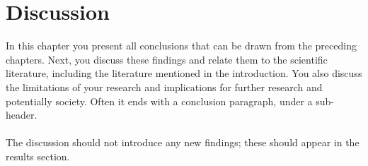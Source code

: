 \chapter{Discussion}\label{discussion}
In this chapter you present all conclusions that can be drawn from the preceding chapters. Next, you discuss these findings and relate them to the scientific literature, including the literature mentioned in the introduction. You also discuss the limitations of your research and implications for further research and potentially society. Often it ends with a conclusion paragraph, under a sub-header.
\\\\
The discussion should not introduce any new findings; these should appear in the results section.




